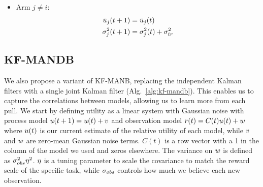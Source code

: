 \begin{algorithm}[h]
\begin{algorithmic}
{\begin{enumerate}
{\begin{itemize}
{                            }
                            \item{Arm $j \neq i$:
                                \begin{align*}
                                    \bar {u}_j(t+1)      &= \bar {u}_j(t) \\
                                    \sigma_j^2(t+1) &= \sigma^2_j(t) + \sigma_{tr}^2
                                \end{align*}
                            }
                        \end{itemize}
                    }
                \end{enumerate}}
        \EndFor
    \end{algorithmic}
\end{algorithm}


\subsection{KF-MANDB}
We also propose a variant of KF-MANB, replacing the independent Kalman filters with a single joint Kalman filter (Alg.~\ref{alg:kf-mandb}). This enables us to capture the correlations between models, allowing us to learn more from each pull. We start by defining utility as a linear system with Gaussian noise with process model $u(t+1) = u(t) + v$ and observation model $r(t) = C(t)u(t) + w$ where $u(t)$ is our current estimate of the relative utility of each model, while $v$ and $w$ are zero-mean Gaussian noise terms. $C(t)$ is a row vector with a 1 in the column of the model we used and zeros elsewhere. The variance on $w$ is defined as $\sigma_{obs}^2 \eta^2$. $\eta$ is a tuning parameter to scale the covariance to match the reward scale of the specific task, while $\sigma_{obs}$ controls how much we believe each new observation.

